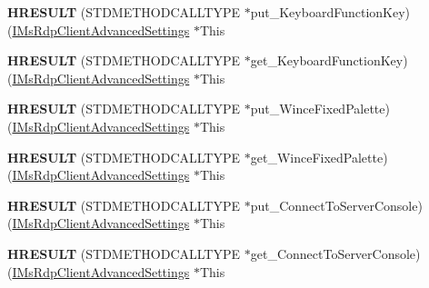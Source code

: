\begin{DoxyCompactItemize}
{\bfseries H\+R\+E\+S\+U\+LT} (S\+T\+D\+M\+E\+T\+H\+O\+D\+C\+A\+L\+L\+T\+Y\+PE $\ast$put\+\_\+\+Keyboard\+Function\+Key)(\hyperlink{interface_m_s_t_s_c_lib_1_1_i_ms_rdp_client_advanced_settings}{I\+Ms\+Rdp\+Client\+Advanced\+Settings} $\ast$This
\item 
\mbox{\label{struct_m_s_t_s_c_lib_1_1_i_ms_rdp_client_advanced_settings_vtbl_ad4a7da81bde3f6dfad24a9935e056e82}} 
{\bfseries H\+R\+E\+S\+U\+LT} (S\+T\+D\+M\+E\+T\+H\+O\+D\+C\+A\+L\+L\+T\+Y\+PE $\ast$get\+\_\+\+Keyboard\+Function\+Key)(\hyperlink{interface_m_s_t_s_c_lib_1_1_i_ms_rdp_client_advanced_settings}{I\+Ms\+Rdp\+Client\+Advanced\+Settings} $\ast$This
\item 
\mbox{\label{struct_m_s_t_s_c_lib_1_1_i_ms_rdp_client_advanced_settings_vtbl_ab9cbfafdf5a647cfbff4c5001fb1749a}} 
{\bfseries H\+R\+E\+S\+U\+LT} (S\+T\+D\+M\+E\+T\+H\+O\+D\+C\+A\+L\+L\+T\+Y\+PE $\ast$put\+\_\+\+Wince\+Fixed\+Palette)(\hyperlink{interface_m_s_t_s_c_lib_1_1_i_ms_rdp_client_advanced_settings}{I\+Ms\+Rdp\+Client\+Advanced\+Settings} $\ast$This
\item 
\mbox{\label{struct_m_s_t_s_c_lib_1_1_i_ms_rdp_client_advanced_settings_vtbl_aad04634c90cd3711c6e53575bd0554b0}} 
{\bfseries H\+R\+E\+S\+U\+LT} (S\+T\+D\+M\+E\+T\+H\+O\+D\+C\+A\+L\+L\+T\+Y\+PE $\ast$get\+\_\+\+Wince\+Fixed\+Palette)(\hyperlink{interface_m_s_t_s_c_lib_1_1_i_ms_rdp_client_advanced_settings}{I\+Ms\+Rdp\+Client\+Advanced\+Settings} $\ast$This
\item 
\mbox{\label{struct_m_s_t_s_c_lib_1_1_i_ms_rdp_client_advanced_settings_vtbl_a4276cf11063bce9acbf0da0b57002e46}} 
{\bfseries H\+R\+E\+S\+U\+LT} (S\+T\+D\+M\+E\+T\+H\+O\+D\+C\+A\+L\+L\+T\+Y\+PE $\ast$put\+\_\+\+Connect\+To\+Server\+Console)(\hyperlink{interface_m_s_t_s_c_lib_1_1_i_ms_rdp_client_advanced_settings}{I\+Ms\+Rdp\+Client\+Advanced\+Settings} $\ast$This
\item 
\mbox{\label{struct_m_s_t_s_c_lib_1_1_i_ms_rdp_client_advanced_settings_vtbl_a6b62e3e7cc3fe1910772b6e1c325da74}} 
{\bfseries H\+R\+E\+S\+U\+LT} (S\+T\+D\+M\+E\+T\+H\+O\+D\+C\+A\+L\+L\+T\+Y\+PE $\ast$get\+\_\+\+Connect\+To\+Server\+Console)(\hyperlink{interface_m_s_t_s_c_lib_1_1_i_ms_rdp_client_advanced_settings}{I\+Ms\+Rdp\+Client\+Advanced\+Settings} $\ast$This

\end{DoxyCompactItemize}
